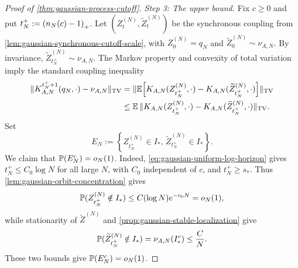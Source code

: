 \documentclass[11pt,reqno,a4paper]{article}
\newcommand{\Pp}{\P}
\newcommand{\Ee}{\E}
\newcommand{\TV}{\mathrm{TV}}
\begin{document}
\begin{proof}[Proof of \cref{thm:gaussian-process-cutoff}]
  \emph{Step 3: The upper bound.}
  Fix $c\geq0$ and put
  $t_N^+:=\pospart{n_N(c)-1}$. Let
  $(Z_t^{(N)},\widetilde Z_t^{(N)})$ be the synchronous coupling from
  \cref{lem:gaussian-synchronous-cutoff-scale}, with
  $Z_0^{(N)}=q_N$ and $\widetilde Z_0^{(N)}\sim\nu_{A,N}$. By invariance,
  $\widetilde Z_{t_N^+}^{(N)}\sim\nu_{A,N}$. The Markov property and convexity
  of total variation imply the standard coupling inequality
  \begin{align}
    \norm{
      K_{A,N}^{t_N^++1}(q_N,\cdot)-\nu_{A,N}
    }_{\TV}
    &=
    \norm{
      \Ee\left[
        K_{A,N}(Z_{t_N^+}^{(N)},\cdot)
        -
        K_{A,N}(\widetilde Z_{t_N^+}^{(N)},\cdot)
      \right]
    }_{\TV}
    \notag\\
    &\leq
    \Ee\,
    \norm{
      K_{A,N}(Z_{t_N^+}^{(N)},\cdot)
      -
      K_{A,N}(\widetilde Z_{t_N^+}^{(N)},\cdot)
    }_{\TV}.
    \label{eq:gaussian-upper-smoothing-reduction}
  \end{align}
  Set
  \begin{equation*}
    E_N
    :=
    \left\{
      Z_{t_N^+}^{(N)}\in I_\ast,\,
      \widetilde Z_{t_N^+}^{(N)}\in I_\ast
    \right\}.
  \end{equation*}
  We claim that $\Pp(E_N^c)=o_N(1)$. Indeed,
  \cref{eq:gaussian-uniform-log-horizon} gives
  $t_N^+\leq C_0\log N$ for all large $N$, with $C_0$ independent of $c$, and
  $t_N^+\geq s_\ast$. Thus
  \cref{lem:gaussian-orbit-concentration} gives
  \begin{equation*}
    \Pp(Z_{t_N^+}^{(N)}\notin I_\ast)
    \leq
    C(\log N)e^{-c_0N}
    =
    o_N(1),
  \end{equation*}
  while stationarity of $\widetilde Z^{(N)}$ and
  \cref{prop:gaussian-stable-localization} give
  \begin{equation*}
    \Pp(\widetilde Z_{t_N^+}^{(N)}\notin I_\ast)
    =
    \nu_{A,N}(I_\ast^c)
    \leq
    \frac{C}{N}.
  \end{equation*}
  These two bounds give $\Pp(E_N^c)=o_N(1)$.


\end{proof}
\end{document}
